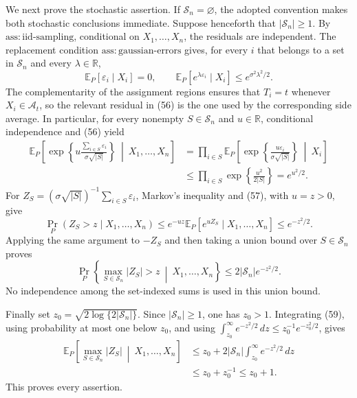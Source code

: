 We next prove the stochastic assertion. If \(\mathscr S_n=\varnothing\), the adopted convention makes both stochastic conclusions immediate. Suppose henceforth that \(|\mathscr S_n|\ge1\). By \(\mathrm{ass:iid\text{-}sampling}\), conditional on \(X_1,\ldots,X_n\), the residuals are independent. The replacement condition \(\mathrm{ass:gaussian\text{-}errors}\) gives, for every \(i\) that belongs to a set in \(\mathscr S_n\) and every \(\lambda\in\mathbb R\),
\[
 \mathbb E_P[\varepsilon_i\mid X_i]=0,
 \qquad
 \mathbb E_P[e^{\lambda\varepsilon_i}\mid X_i]
 \le e^{\sigma^2\lambda^2/2}. \tag{56}
\]
The complementarity of the assignment regions ensures that \(T_i=t\) whenever \(X_i\in\mathcal A_t\), so the relevant residual in (56) is the one used by the corresponding side average. In particular, for every nonempty \(S\in\mathscr S_n\) and \(u\in\mathbb R\), conditional independence and (56) yield
\[
 \begin{aligned}
 \mathbb E_P\!\left[
  \exp\!\left\{u\frac{\sum_{i\in S}\varepsilon_i}
  {\sigma\sqrt{|S|}}\right\}
  \ \middle|\ X_1,\ldots,X_n\right]
 &=\prod_{i\in S}
 \mathbb E_P\!\left[
  \exp\!\left\{\frac{u\varepsilon_i}{\sigma\sqrt{|S|}}\right\}
  \ \middle|\ X_i\right]\\
 &\le\prod_{i\in S}\exp\!\left\{\frac{u^2}{2|S|}\right\}
 =e^{u^2/2}.
 \end{aligned}\tag{57}
\]
For \(Z_S=(\sigma\sqrt{|S|})^{-1}\sum_{i\in S}\varepsilon_i\), Markov's inequality and (57), with \(u=z>0\), give
\[
 \Pr_P(Z_S>z\mid X_1,\ldots,X_n)
 \le e^{-uz}\mathbb E_P[e^{uZ_S}\mid X_1,\ldots,X_n]
 \le e^{-z^2/2}. \tag{58}
\]
Applying the same argument to \(-Z_S\) and then taking a union bound over \(S\in\mathscr S_n\) proves
\[
 \Pr_P\left\{\max_{S\in\mathscr S_n}|Z_S|>z
 \ \middle|\ X_1,\ldots,X_n\right\}
 \le2|\mathscr S_n|e^{-z^2/2}. \tag{59}
\]
No independence among the set-indexed sums is used in this union bound.

Finally set \(z_0=\sqrt{2\log\{2|\mathscr S_n|\}}\). Since \(|\mathscr S_n|\ge1\), one has \(z_0>1\). Integrating (59), using probability at most one below \(z_0\), and using \(\int_{z_0}^{\infty}e^{-z^2/2}\,dz\le z_0^{-1}e^{-z_0^2/2}\), gives
\[
 \begin{aligned}
 \mathbb E_P\!\left[\max_{S\in\mathscr S_n}|Z_S|
 \ \middle|\ X_1,\ldots,X_n\right]
 &\le z_0+2|\mathscr S_n|\int_{z_0}^{\infty}e^{-z^2/2}\,dz\\
 &\le z_0+z_0^{-1}\le z_0+1.
 \end{aligned}
\]
This proves every assertion.